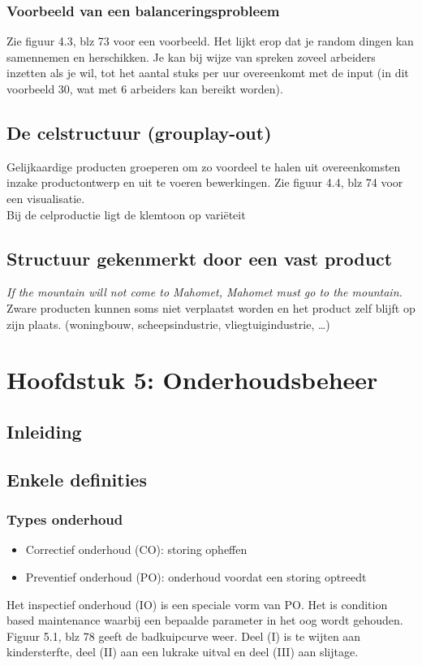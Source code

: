 \documentclass[12pt]{article}
\begin{document}
\subsubsection{Voorbeeld van een balanceringsprobleem}
Zie figuur 4.3, blz 73 voor een voorbeeld. Het lijkt erop dat je random dingen kan samennemen en herschikken. Je kan bij wijze van spreken zoveel arbeiders inzetten als je wil, tot het aantal stuks per uur overeenkomt met de input (in dit voorbeeld 30, wat met 6 arbeiders kan bereikt worden).
\subsection{De celstructuur (grouplay-out)}
Gelijkaardige producten groeperen om zo voordeel te halen uit overeenkomsten inzake productontwerp en uit te voeren bewerkingen. Zie figuur 4.4, blz 74 voor een visualisatie.\\
Bij de celproductie ligt de klemtoon op vari\"eteit
\subsection{Structuur gekenmerkt door een vast product}
\textit{If the mountain will not come to Mahomet, Mahomet must go to the mountain.}\\
Zware producten kunnen soms niet verplaatst worden en het product zelf blijft op zijn plaats. (woningbouw, scheepsindustrie, vliegtuigindustrie, \dots)
\clearpage
\section{Hoofdstuk 5: Onderhoudsbeheer}
\subsection{Inleiding}
\subsection{Enkele definities}
\subsubsection{Types onderhoud}
\begin{itemize}
\item Correctief onderhoud (CO): storing opheffen
\item Preventief onderhoud (PO): onderhoud voordat een storing optreedt
\end{itemize}
Het inspectief onderhoud (IO) is een speciale vorm van PO. Het is condition based maintenance waarbij een bepaalde parameter in het oog wordt gehouden.\\
Figuur 5.1, blz 78 geeft de badkuipcurve weer. Deel (I) is te wijten aan kindersterfte, deel (II) aan een lukrake uitval en deel (III) aan slijtage.
\end{document}
